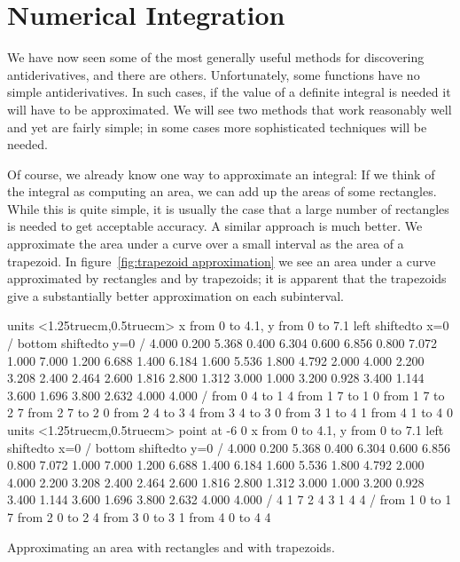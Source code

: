 \section{Numerical Integration}{}{}\label{sec:Numberical Integration}
We have now seen some of the most generally useful methods
for discovering antiderivatives, and there are others. 
Unfortunately, some functions
have no simple antiderivatives. In such cases, if the value of a
definite integral is needed it will have to be approximated. We will
see two methods that work reasonably well and yet are fairly simple;
in some cases more sophisticated techniques will be needed.

Of course, we already know one way to approximate an integral: If we
think of the integral as computing an area, we can add up the areas of
some rectangles. While this is quite simple, it is usually the case
that a large number of rectangles is needed to get acceptable
accuracy. A similar approach is much better. We approximate the area
under a curve over a small interval as the area of a trapezoid. In
figure~\ref{fig:trapezoid approximation} we see an area under 
a curve approximated by rectangles and by trapezoids; it is apparent
that the trapezoids give a substantially better approximation on each
subinterval. 

\figure[H]
\centerline{\vbox{\beginpicture
\normalgraphs
\setcoordinatesystem units <1.25truecm,0.5truecm>
\setplotarea x from 0 to 4.1, y from 0 to 7.1
\axis left shiftedto x=0 /
\axis bottom shiftedto y=0 /
\setquadratic
{} 4.000 0.200 5.368 0.400 6.304 0.600 6.856 0.800 7.072
1.000 7.000 1.200 6.688 1.400 6.184 1.600 5.536 1.800 4.792
2.000 4.000 2.200 3.208 2.400 2.464 2.600 1.816 2.800 1.312
3.000 1.000 3.200 0.928 3.400 1.144 3.600 1.696 3.800 2.632
4.000 4.000 /
\setdashes <2pt>
\putrule from 0 4 to 1 4
\putrule from 1 7 to 1 0
\putrule from 1 7 to 2 7
\putrule from 2 7 to 2 0
\putrule from 2 4 to 3 4
\putrule from 3 4 to 3 0
\putrule from 3 1 to 4 1
\putrule from 4 1 to 4 0
\setsolid
\setcoordinatesystem units <1.25truecm,0.5truecm> point at -6 0
\setplotarea x from 0 to 4.1, y from 0 to 7.1
\axis left shiftedto x=0 /
\axis bottom shiftedto y=0 /
\setquadratic
{} 4.000 0.200 5.368 0.400 6.304 0.600 6.856 0.800 7.072
1.000 7.000 1.200 6.688 1.400 6.184 1.600 5.536 1.800 4.792
2.000 4.000 2.200 3.208 2.400 2.464 2.600 1.816 2.800 1.312
3.000 1.000 3.200 0.928 3.400 1.144 3.600 1.696 3.800 2.632
4.000 4.000 /
\setlinear
\setdashes <2pt>
 4 1 7 2 4 3 1 4 4 /
\putrule from 1 0 to 1 7
\putrule from 2 0 to 2 4
\putrule from 3 0 to 3 1
\putrule from 4 0 to 4 4
\endpicture}}
\caption{\label{fig:trapezoid approximation}
Approximating an area with rectangles and with trapezoids.}
\endfigure

